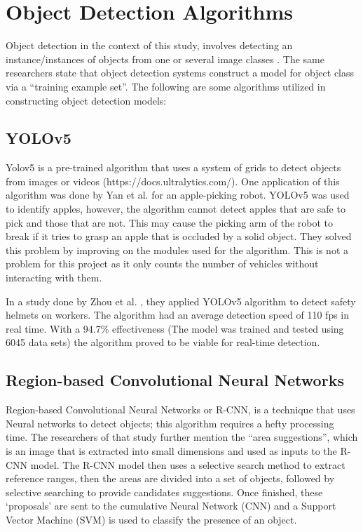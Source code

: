 \section{Object Detection Algorithms}
Object detection in the context of this study, involves detecting an instance/instances of objects from one or several image classes \cite{Amit_Felzenszwalb_Girshick_2020}. The same researchers state that object detection systems construct a model for object class via a “training example set”. The following are some algorithms utilized in constructing object detection models:

\subsection{YOLOv5}

Yolov5 is a pre-trained algorithm that uses a system of grids to detect objects from images or videos (https://docs.ultralytics.com/). 
One application of this algorithm was done by Yan et al. \citeyear{yan_2021} for an apple-picking robot. YOLOv5 was used to identify apples, however, the algorithm cannot detect apples that are safe to pick and those that are not. This may cause the picking arm of the robot to break if it tries to grasp an apple that is occluded by a solid object. They solved this problem by improving on the modules used for the algorithm. This is not a problem for this project as it only counts the number of vehicles without interacting with them. 

In a study done by Zhou et al. \citeyear{zhou_2021}, they applied YOLOv5 algorithm to detect safety helmets on workers. The algorithm had an average detection speed of 110 fps in real time. With a 94.7\% effectiveness (The model was trained and tested  using 6045 data sets) the algorithm proved to be viable for real-time detection.

\subsection{Region-based Convolutional Neural Networks}

Region-based Convolutional Neural Networks or R-CNN, is a technique that uses Neural networks to detect objects; this algorithm requires a hefty processing time.\cite{Cuong_Trinh_Meesad_Nguyen_2022} The researchers of that study further mention the “area suggestions”, which is an image that is extracted into small dimensions and used as inputs to the R-CNN model. The R-CNN model then uses a selective search method to extract reference ranges, then the areas are divided into a set of objects, followed by selective searching to provide candidates suggestions. Once finished, these ‘proposals’ are sent to the cumulative Neural Network (CNN)  and a Support Vector Machine (SVM) is used to classify the presence of an object.

